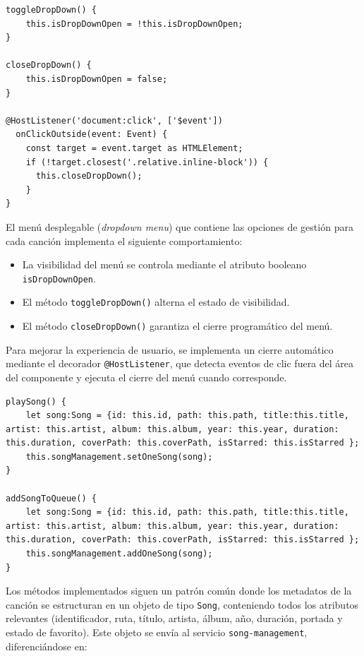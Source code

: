 \documentclass[11pt, a4paper]{article}
\begin{document}
                \begin{lstlisting}[caption={Dropdown menu}]
toggleDropDown() {
    this.isDropDownOpen = !this.isDropDownOpen;
}

closeDropDown() {
    this.isDropDownOpen = false;
}

@HostListener('document:click', ['$event'])
  onClickOutside(event: Event) {
    const target = event.target as HTMLElement;
    if (!target.closest('.relative.inline-block')) {
      this.closeDropDown();
    }
}
                \end{lstlisting}

                El menú desplegable (\textit{dropdown menu}) que contiene las opciones de gestión para cada canción implementa el siguiente comportamiento:

                \begin{itemize}
                  \item La visibilidad del menú se controla mediante el atributo booleano \texttt{isDropDownOpen}.
                  \item El método \texttt{toggleDropDown()} alterna el estado de visibilidad.
                  \item El método \texttt{closeDropDown()} garantiza el cierre programático del menú.
                \end{itemize}

                Para mejorar la experiencia de usuario, se implementa un cierre automático mediante el decorador \texttt{@HostListener}, que detecta eventos de clic fuera del área del componente y ejecuta el cierre del menú cuando corresponde.

                \begin{lstlisting}[caption={playSong() y addSongToQueue()}]
playSong() {
    let song:Song = {id: this.id, path: this.path, title:this.title, artist: this.artist, album: this.album, year: this.year, duration: this.duration, coverPath: this.coverPath, isStarred: this.isStarred };
    this.songManagement.setOneSong(song);
}

addSongToQueue() {
    let song:Song = {id: this.id, path: this.path, title:this.title, artist: this.artist, album: this.album, year: this.year, duration: this.duration, coverPath: this.coverPath, isStarred: this.isStarred };
    this.songManagement.addOneSong(song);
}
                \end{lstlisting}

                Los métodos implementados siguen un patrón común donde los metadatos de la canción se estructuran en un objeto de tipo \texttt{Song}, conteniendo todos los atributos relevantes (identificador, ruta, título, artista, álbum, año, duración, portada y estado de favorito). Este objeto se envía al servicio \texttt{song-management}, diferenciándose en:
\end{document}
